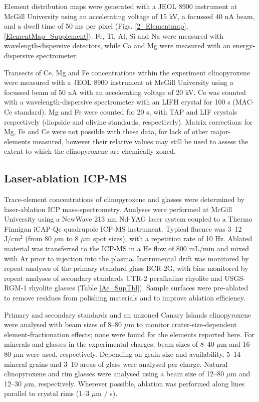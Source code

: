 \documentclass[review,authoryear,12pt]{elsarticle}
\begin{document}
Element distribution maps were generated with a JEOL 8900 instrument at McGill University using an accelerating voltage of 15 kV, a focussed 40 nA beam, and a dwell time of 50 ms per pixel (Figs. \ref{2_Elementmap}, \ref{ElementMap_Supplement}). Fe, Ti, Al, Si and Na were measured with wavelength-dispersive detectors, while Ca and Mg were measured with an energy-dispersive spectrometer.

Transects of Ce, Mg and Fe concentrations within the experiment clinopyroxene were measured with a JEOL 8900 instrument at McGill University using a focussed beam of 50 nA with an accelerating voltage of 20 kV. Ce was counted with a wavelength-dispersive spectrometer with an LIFH crystal for 100 s (MAC-Ce standard). Mg and Fe were counted for 20 s, with TAP and LIF crystals respectively (diopside and olivine standards, respectively). Matrix corrections for Mg, Fe and Ce were not possible with these data, for lack of other major-elements measured, however their relative values may still be used to assess the extent to which the clinopyroxene are chemically zoned.  

\subsection{Laser-ablation ICP-MS}
Trace-element concentrations of clinopyroxene and glasses were determined by laser-ablation ICP mass-spectrometry. Analyses were performed at McGill University using a NewWave 213 nm Nd-YAG laser system coupled to a Thermo Finnigan iCAP-Qc quadrupole ICP-MS instrument. Typical fluence was 3--12 J/cm$^2$ (from 80 $\mu$m to 8 $\mu$m spot sizes), with a repetition rate of 10 Hz. Ablated material was transferred to the ICP-MS in a He flow of 800 mL/min and mixed with Ar prior to injection into the plasma. Instrumental drift was monitored by repeat analyses of the primary standard glass BCR-2G, with bias monitored by repeat analyses of secondary standards UTR-2 peralkaline rhyolite and USGS-RGM-1 rhyolite glasses (Table \ref{Ae_SupTbl}). Sample surfaces were pre-ablated to remove residues from polishing materials and to improve ablation efficiency. 

Primary and secondary standards and an unzoned Canary Islands clinopyroxene were analysed with beam sizes of 8--80 $\mu$m to monitor crater-size-dependent element-fractionation effects; none were found for the elements reported here. For minerals and glasses in the experimental charges, beam sizes of 8--40 $\mu$m and 16--80 $\mu$m were used, respectively. Depending on grain-size and availability, 5--14 mineral grains and 3--10 areas of glass were analysed per charge. Natural clinopyroxene and rim glasses were analysed using a beam size of 12--80 $\mu$m and 12--30 $\mu$m, respectively. Wherever possible, ablation was performed along lines parallel to crystal rims (1--3 $\mu$m / s).
\end{document}
